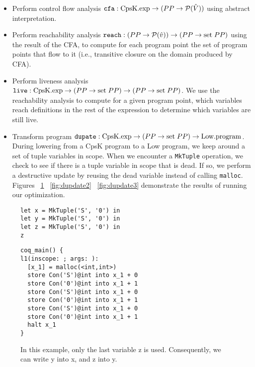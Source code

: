 \documentclass{article}
\begin{document}
\begin{itemize}
\item Perform control flow analysis ${\tt cfa} : {\rm CpsK.exp} \rightarrow (PP \rightarrow \mathcal{P}(\hat{V}))$ using abstract interpretation. 
\item Perform reachability analysis ${\tt reach} : (PP \rightarrow \mathcal{P}(\hat{v})) \rightarrow (PP \rightarrow {\rm set} \; PP)$ using the result of the CFA, to compute for each program point the set of program points that flow to it (i.e., transitive closure on the domain produced by CFA).
\item Perform liveness analysis ${\tt live} : {\rm CpsK.exp} \rightarrow (PP \rightarrow {\rm set} \; PP) \rightarrow (PP \rightarrow {\rm set} \; PP)$. We use the reachability analysis to compute for a given program point, which variables reach definitions in the rest of the expression to determine which variables are still live. 
\item Transform program ${\tt dupate} : {\rm CpsK.exp} \rightarrow (PP \rightarrow {\rm set} \; PP) \rightarrow {\rm Low.program}$. During lowering from a CpsK program to a Low program, we keep around a set of tuple variables in scope. When we encounter a {\tt MkTuple} operation, we check to see if there is a tuple variable in scope that is dead. If so, we perform a destructive update by reusing the dead variable instead of calling {\tt malloc}. Figures ~\ref{fig:dupdate1} ~\ref{fig:dupdate2} ~\ref{fig:dupdate3} demonstrate the results of running our optimization.
\end{itemize}

\begin{figure}
\centering
\begin{minipage}[t]{.4\textwidth}
\begin{lstlisting}
let x = MkTuple('S', '0') in
let y = MkTuple('S', '0') in
let z = MkTuple('S', '0') in
z
\end{lstlisting}
\end{minipage}
\hspace{20pt}
\begin{minipage}[t]{.4\textwidth}
\begin{lstlisting}
coq_main() {
l1(inscope: ; args: ):
  [x_1] = malloc(<int,int>)
  store Con('S')@int into x_1 + 0
  store Con('0')@int into x_1 + 1
  store Con('S')@int into x_1 + 0
  store Con('0')@int into x_1 + 1
  store Con('S')@int into x_1 + 0
  store Con('0')@int into x_1 + 1
  halt x_1
}
\end{lstlisting}
\end{minipage}
\caption{In this example, only the last variable z is
   used. Consequently, we can write y into x, and z into y. }
\label{fig:dupdate1}
\end{figure}
\end{document}
